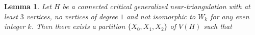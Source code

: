 \documentclass[12pt]{article}
\newtheorem{lem}{Lemma}
\theoremstyle{definition}
\newcommand{\pat}[1]{[\textcolor{red}{PM: #1}]}
\begin{document}
\begin{lem}\label{critical}
  Let $H$ be a connected critical generalized near-triangulation with at least $3$ vertices, no vertices of degree $1$ and not isomorphic to $W_k$ for any even integer $k$.  Then there exists a partition $\{X_0,X_1,X_2\}$ of $V(H)$ such that
\end{lem}
\end{document}
